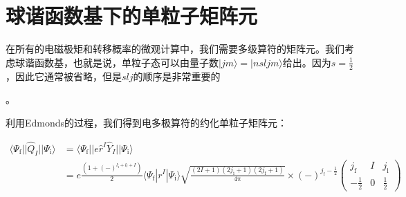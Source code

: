 \section{球谐函数基下的单粒子矩阵元}

在所有的电磁极矩和转移概率的微观计算中，我们需要多级算符的矩阵元。我们考虑球谐函数基，也就是说，单粒子态可以由量子数$|jm\rangle=|nsljm\rangle$给出。因为$s=\frac{1}{2}$，因此它通常被省略，但是$slj$的顺序是非常重要的

。

利用Edmonds\cite{Ed57}的过程，我们得到电多极算符的约化单粒子矩阵元：

\begin{align*}
\langle\Psi_{\text{f}}||\hat{Q}_{I}||\Psi_{\text{i}}\rangle & =\langle\Psi_{\text{f}}||e\hat{r}^{I}\hat{Y}_{I}||\Psi_{\text{i}}\rangle\\
 & =e\frac{(1+(-)^{l_{\text{i}}+l_{\text{f}}+I})}{2}\langle\Psi_{\text{f}}|r^{I}|\Psi_{\text{i}}\rangle\sqrt{\frac{(2I+1)(2j_{\text{i}}+1)(2j_{\text{f}}+1)}{4\mathrm{\pi}}}\times(-)^{j_{\text{f}}-\frac{1}{2}}\begin{pmatrix}j_{\text{f}} & I & j_{\text{i}}\\
-\frac{1}{2} & 0 & \frac{1}{2}
\end{pmatrix}
\end{align*}

